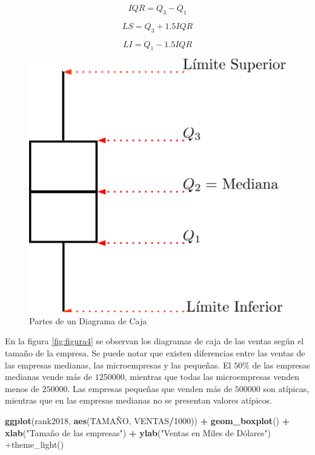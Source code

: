 \documentclass[letterpaper,]{book}
\newenvironment{Shaded}{\begin{snugshade}}{\end{snugshade}}
\newcommand{\DecValTok}[1]{\textcolor[rgb]{0.00,0.00,0.81}{#1}}
\newcommand{\KeywordTok}[1]{\textcolor[rgb]{0.13,0.29,0.53}{\textbf{#1}}}
\newcommand{\NormalTok}[1]{#1}
\newcommand{\OperatorTok}[1]{\textcolor[rgb]{0.81,0.36,0.00}{\textbf{#1}}}
\newcommand{\StringTok}[1]{\textcolor[rgb]{0.31,0.60,0.02}{#1}}
\begin{document}
\begin{equation} 
  IQR = Q_3 - Q_1
  \label{eq:iqr}
\end{equation}

\begin{equation} 
  LS = Q_3 + 1.5IQR
  \label{eq:ls}
\end{equation}

\begin{equation} 
  LI = Q_1 - 1.5IQR
  \label{eq:li}
\end{equation}

\begin{figure}[h!]

{\centering \includegraphics[width=0.4\linewidth]{boxplot3} 

}

\caption{Partes de un Diagrama de Caja}\label{fig:caja1}
\end{figure}

En la figura \ref{fig:figura4} se observan los diagramas de caja de las ventas según el tamaño de la empresa. Se puede notar que existen diferencias entre las ventas de las empresas medianas, las microempresas y las pequeñas. El \(50\%\) de las empresas medianas vende más de \(1250000\), mientras que todas las microempresas venden menos de \(250000\). Las empresas pequeñas que venden más de \(500000\) son atípicas, mientras que en las empresas medianas no se presentan valores atípicos.

\begin{Shaded}
\begin{Highlighting}[]
\KeywordTok{ggplot}\NormalTok{(rank2018, }\KeywordTok{aes}\NormalTok{(TAMAÑO, VENTAS}\OperatorTok{/}\DecValTok{1000}\NormalTok{)) }\OperatorTok{+}\StringTok{ }
\StringTok{  }\KeywordTok{geom_boxplot}\NormalTok{() }\OperatorTok{+}\StringTok{ }\KeywordTok{xlab}\NormalTok{(}\StringTok{"Tamaño de las empresas"}\NormalTok{) }\OperatorTok{+}
\StringTok{  }\KeywordTok{ylab}\NormalTok{(}\StringTok{"Ventas en Miles de Dólares") +theme_light()}
\end{Highlighting}
\end{Shaded}
\end{document}
